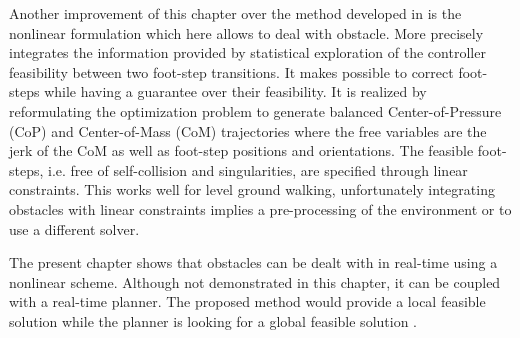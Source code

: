Another improvement of this chapter over the method developed in \cite{herdt:iros:2010} is the nonlinear formulation which here allows to deal with obstacle.
More precisely \cite{herdt:iros:2010} integrates the information provided by statistical exploration of the controller feasibility 
between two foot-step transitions. It makes possible to correct foot-steps while having a guarantee over their feasibility.
It is realized by reformulating the optimization problem to generate balanced Center-of-Pressure (CoP) and Center-of-Mass (CoM) trajectories where the free variables are the jerk of the CoM as well as foot-step positions and orientations.
The feasible foot-steps, i.e. free of self-collision and singularities, are specified through linear constraints.
This works well for level ground walking, unfortunately integrating obstacles with linear constraints implies a pre-processing of the environment or to use a different solver.

The present chapter shows that obstacles can be dealt with in real-time using a nonlinear scheme.
Although not demonstrated in this chapter, it can be coupled with a real-time planner.
The proposed method would provide a local feasible solution while the planner is looking for a global feasible solution \cite{perrin:itro:12}.

